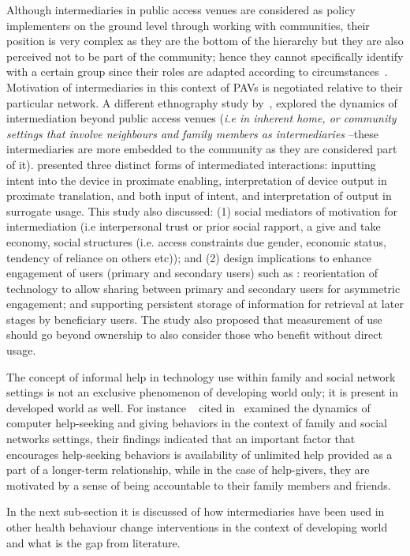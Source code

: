 Although intermediaries in public access venues are considered as policy implementers on the ground level through working with communities, their position is very complex as they are the bottom of the hierarchy but they are also perceived not to be part of the community; hence they cannot specifically identify with a certain group since their roles are adapted according to circumstances~\citep{bailur2010liminal}. Motivation of intermediaries in this context of PAVs is negotiated relative to their particular network. A different ethnography study by~\cite{sambasivan2010}, explored the dynamics of intermediation beyond public access venues (\emph{i.e in inherent home, or community settings that involve neighbours and family members as intermediaries} --these intermediaries are more embedded to the community as they are considered part of it). \cite{sambasivan2010} presented three distinct forms of intermediated interactions: inputting intent into the device in proximate enabling, interpretation of device output in proximate translation, and both input of intent, and interpretation of output in surrogate usage. This study also discussed: (1) social mediators of motivation for intermediation (i.e interpersonal trust or prior social rapport, a give and take economy, social structures (i.e. access constraints due gender, economic status, tendency of reliance on others etc)); and (2) design implications to enhance engagement of users (primary and secondary users) such as : reorientation of technology  to allow sharing between primary and secondary users for asymmetric engagement; and supporting persistent storage of information for retrieval at later stages by beneficiary users. The study also proposed that measurement of use should go beyond ownership to also consider those who benefit without direct usage. 

The concept of informal help in technology use within family and social network settings is not an exclusive  phenomenon of developing world only; it is present in developed world as well. For instance ~\cite{poole:chh} cited in~\cite{katule2016leveraging} examined the dynamics of computer help-seeking and giving behaviors in the context of family and social networks settings, their findings indicated that an important factor that  encourages help-seeking behaviors is availability of unlimited help provided as a part of a longer-term relationship, while in the case of help-givers, they are motivated by a sense of being accountable to their family members and friends.

In the next sub-section it is discussed of how intermediaries have been used in other health behaviour change interventions in the context of developing world and what is the gap from literature.

